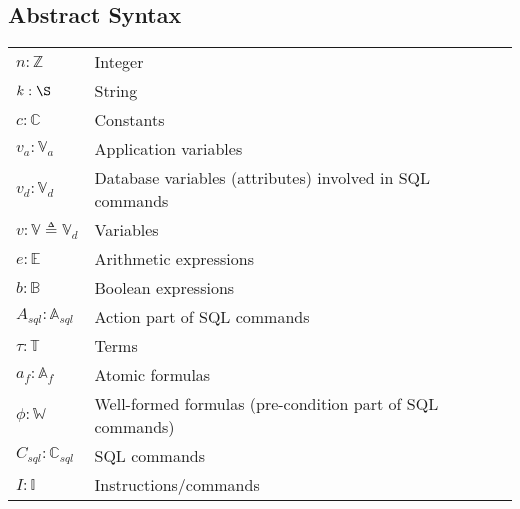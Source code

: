 \subsection{Abstract Syntax} \label{subsec:function-definitions}

\begin{center}
    \begin{tabular}{l l}
        $n: \mathbb{Z}$                          & Integer                                                   \\
        $k: \S$                                  & String                                                    \\
        $c: \mathbb{C}$                          & Constants                                                 \\
        $v_a: \mathbb{V}_a$                      & Application variables                                     \\
        $v_d: \mathbb{V}_d$                      & Database variables (attributes) involved in SQL commands  \\
        $v: \mathbb{V} \triangleq \mathbb{V}_d $ & Variables                                                 \\
        $e: \mathbb{E}$                          & Arithmetic expressions                                    \\
        $b: \mathbb{B}$                          & Boolean expressions                                       \\
        $A_{sql}: \mathbb{A}_{sql}$              & Action part of SQL commands                               \\
        $\tau: \mathbb{T}$                       & Terms                                                     \\
        $a_f: \mathbb{A}_f$                      & Atomic formulas                                           \\
        $\phi : \mathbb{W}$                      & Well-formed formulas (pre-condition part of SQL commands) \\
        $C_{sql}: \mathbb{C}_{sql}$              & SQL commands                                              \\
        $I: \mathbb{I}$                          & Instructions/commands                                     \\
    \end{tabular}
\end{center}

